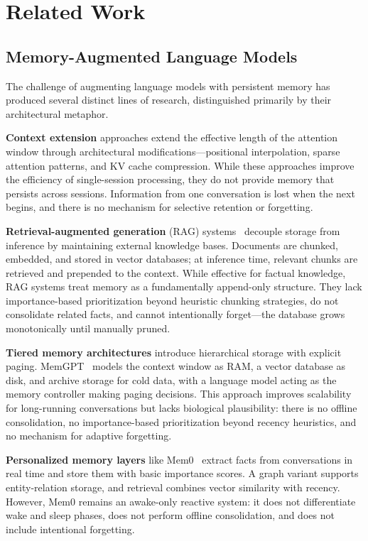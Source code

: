 \documentclass[11pt,twocolumn]{article}
\begin{document}
\section{Related Work}

\subsection{Memory-Augmented Language Models}

The challenge of augmenting language models with persistent memory has produced several distinct lines of research, distinguished primarily by their architectural metaphor.

\textbf{Context extension} approaches extend the effective length of the attention window through architectural modifications---positional interpolation, sparse attention patterns, and KV cache compression. While these approaches improve the efficiency of single-session processing, they do not provide memory that persists across sessions. Information from one conversation is lost when the next begins, and there is no mechanism for selective retention or forgetting.

\textbf{Retrieval-augmented generation} (RAG) systems~\cite{lewis2020rag} decouple storage from inference by maintaining external knowledge bases. Documents are chunked, embedded, and stored in vector databases; at inference time, relevant chunks are retrieved and prepended to the context. While effective for factual knowledge, RAG systems treat memory as a fundamentally append-only structure. They lack importance-based prioritization beyond heuristic chunking strategies, do not consolidate related facts, and cannot intentionally forget---the database grows monotonically until manually pruned.

\textbf{Tiered memory architectures} introduce hierarchical storage with explicit paging. MemGPT~\cite{packer2023memgpt} models the context window as RAM, a vector database as disk, and archive storage for cold data, with a language model acting as the memory controller making paging decisions. This approach improves scalability for long-running conversations but lacks biological plausibility: there is no offline consolidation, no importance-based prioritization beyond recency heuristics, and no mechanism for adaptive forgetting.

\textbf{Personalized memory layers} like Mem0~\cite{mem0} extract facts from conversations in real time and store them with basic importance scores. A graph variant supports entity-relation storage, and retrieval combines vector similarity with recency. However, Mem0 remains an awake-only reactive system: it does not differentiate wake and sleep phases, does not perform offline consolidation, and does not include intentional forgetting.
\end{document}
